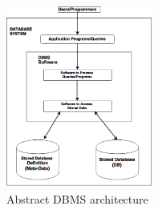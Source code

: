  \begin{figure} 
      \centering
      \includegraphics[width=\textwidth,height=6cm]{Images/Chapter1/db_arch}
      \caption{Abstract DBMS architecture}
      \label{fig:counting-methods}
    \end{figure}

  

